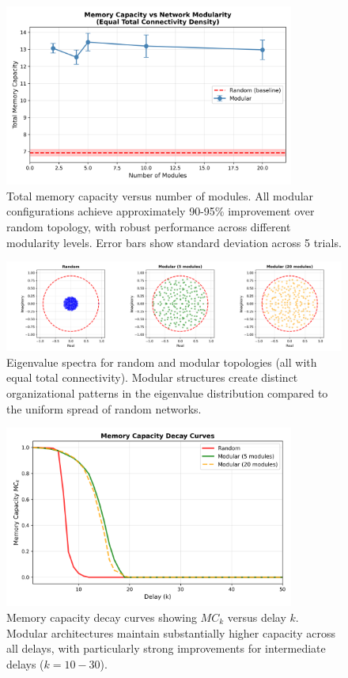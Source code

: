 \documentclass{article}
\begin{document}
\begin{figure}[h]
\centering
\includegraphics[width=0.85\textwidth]{memory_vs_modularity.png}
\caption{Total memory capacity versus number of modules. All modular configurations achieve approximately 90-95\% improvement over random topology, with robust performance across different modularity levels. Error bars show standard deviation across 5 trials.}
\label{fig:mc_vs_modularity}
\end{figure}

\begin{figure}[h]
\centering
\includegraphics[width=\textwidth]{eigenvalue_spectra.png}
\caption{Eigenvalue spectra for random and modular topologies (all with equal total connectivity). Modular structures create distinct organizational patterns in the eigenvalue distribution compared to the uniform spread of random networks.}
\label{fig:spectra}
\end{figure}

\begin{figure}[h]
\centering
\includegraphics[width=0.85\textwidth]{mc_decay_curves.png}
\caption{Memory capacity decay curves showing $MC_k$ versus delay $k$. Modular architectures maintain substantially higher capacity across all delays, with particularly strong improvements for intermediate delays ($k = 10-30$).}
\label{fig:decay}
\end{figure}
\end{document}
